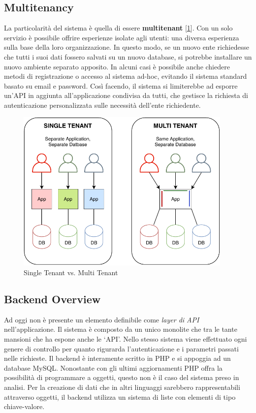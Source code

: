 \subsection{Multitenancy}
La particolarità del sistema è quella di essere \textbf{multitenant} [\ref{fig:multitenancy}]. Con un solo servizio è possibile offrire esperienze isolate agli utenti: una diversa esperienza sulla base della loro organizzazione. In questo modo, se un nuovo ente richiedesse che tutti i suoi dati fossero salvati su un nuovo database, si potrebbe installare un nuovo ambiente separato apposito. In alcuni casi è possibile anche chiedere metodi di registrazione o accesso al sistema ad-hoc, evitando il sistema standard basato su email e password. Così facendo, il sistema si limiterebbe ad esporre un'API in aggiunta all'applicazione condivisa da tutti, che gestisce la richiesta di autenticazione personalizzata sulle necessità dell'ente richiedente.
\begin{figure}[H]
    \centering
    \includegraphics[width=0.94\textwidth]{images/02_2_multitenancy.pdf}
    \caption{Single Tenant vs. Multi Tenant}
    \label{fig:multitenancy}
\end{figure}

\subsection{Backend Overview}
Ad oggi non è presente un elemento definibile come \emph{layer di API} nell’applicazione. Il sistema è composto da un unico monolite che tra le tante mansioni che ha espone anche le `API'. Nello stesso sistema viene effettuato ogni genere di controllo per quanto rigurarda l'autenticazione e i parametri passati nelle richieste. Il backend è interamente scritto in PHP e si appoggia ad un database MySQL. Nonostante con gli ultimi aggiornamenti PHP offra la possibilità di programmare a oggetti, questo non è il caso del sistema preso in analisi. Per la creazione di dati che in altri linguaggi sarebbero rappresentabili attraverso oggetti, il backend utilizza un sistema di liste con elementi di tipo chiave-valore.

